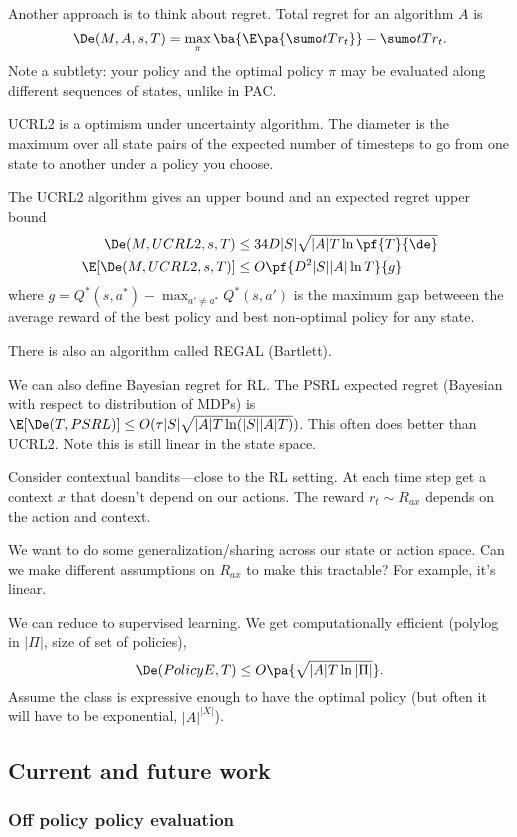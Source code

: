 Another approach is to think about regret. Total regret for an algorithm $A$ is
$$
\De(M, A, s, T) = \max_\pi\ba{\E\pa{\sumo tT r_t}} - \sumo tT r_t.
$$
Note a subtlety: your policy and the optimal policy $\pi$ may be evaluated along different sequences of states, unlike in PAC.

UCRL2 is a optimism under uncertainty algorithm. The diameter is the maximum over all state pairs of the expected number of timesteps to go from one state to another under a policy you choose.

The UCRL2 algorithm gives an upper bound and an expected regret upper bound
\begin{align}
\De(M,UCRL2,s,T) &\le 34D|S| \sqrt{|A|T\ln \pf{T}{\de}}\\
\E[\De(M,UCRL2, s,T)] &\le O\pf{D^2|S||A|\ln T}{g}
\end{align}
where $g  = Q^*(s,a^*) - \max_{a'\ne a^*} Q^*(s,a')$ is the maximum gap betweeen the average reward of the best policy and best non-optimal policy for any state.

There is also an algorithm called REGAL (Bartlett).

We can also define Bayesian regret for RL. The PSRL expected regret (Bayesian with respect to distribution of MDPs) is $\E[\De(T,PSRL)] \le O(\tau|S|\sqrt{|A|T\ln (|S||A|T)})$. This often does better than UCRL2. Note this is still linear in the state space.

Consider contextual bandits---close to the RL setting. At each time step get a context $x$ that doesn't depend on our actions. The reward $r_t\sim R_{ax}$ depends on the action and context.

We want to do some generalization/sharing across our state or action space. Can we make different assumptions on $R_{ax}$ to make this tractable? For example, it's linear. %

We can reduce to supervised learning. We get computationally efficient (polylog in $|\Pi|$, size of set of policies),
$$
\De(PolicyE, T)\le O\pa{\sqrt{|A|T\ln |\Pi|}}.
$$
Assume the class is expressive enough to have the optimal policy (but often it will have to be exponential, $|A|^{|X|}$).

\subsection{Current and future work}

\subsubsection{Off policy policy evaluation}

